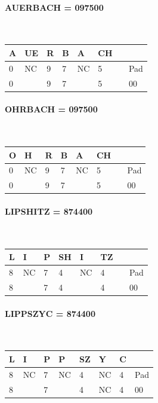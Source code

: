 \documentclass[12pt,a4paper]{article}
\begin{document}
	\paragraph{AUERBACH = 097500\\} 
	~\\
	\begin{tabular}{|l|l|l|l|l|l|l|}
		\hline
		A & UE & R & B & A & CH ~ &\\
		\hline
		0 & NC & 9 & 7 & NC & 5 & Pad \\
		\hline
		0  & ~ & 9 & 7 & &   5 & 00	\\
		\hline
	\end{tabular}

	 
	\paragraph{OHRBACH = 097500\\} 
	~\\
	\begin{tabular}{|l|l|l|l|l|l|l|}
		\hline
		O & H & R & B & A & CH ~ &\\
		\hline
		0 & NC & 9 & 7 & NC & 5 & Pad \\
		\hline
		0  & ~ & 9 & 7 & &   5 & 00	\\
		\hline
	\end{tabular}
	
	\paragraph{LIPSHITZ = 874400\\} 
	~\\
	\begin{tabular}{|l|l|l|l|l|l|l|}
		\hline
		L & I & P & SH & I & TZ ~ &\\
		\hline
		8 & NC & 7 & 4 & NC & 4 & Pad \\
		\hline
		8  & ~ &7  & 4 & &   4 & 00	\\
		\hline
	\end{tabular}
	
	\paragraph{LIPPSZYC = 874400\\} 
	~\\
	\begin{tabular}{|l|l|l|l|l|l|l|l|}
		\hline
		L & I & P & P & SZ & Y & C & ~ \\
		\hline
		8 & NC & 7 & NC & 4 & NC & 4 & Pad \\
		\hline
		8 &   & 7 &   & 4 & NC & 4 & 00 \\
		\hline
	\end{tabular}
	
\end{document}
